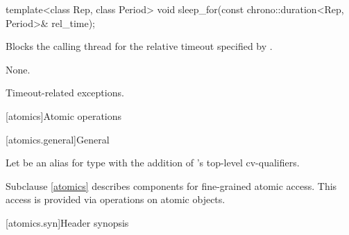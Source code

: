 %
\begin{itemdecl}
template<class Rep, class Period>
  void sleep_for(const chrono::duration<Rep, Period>& rel_time);
\end{itemdecl}

\begin{itemdescr}
\pnum
{}%
\effects
Blocks the calling thread for the relative timeout specified
by .

\pnum
\sync
None.

\pnum
\throws
Timeout-related exceptions.
\end{itemdescr}

[atomics]{Atomic operations}

[atomics.general]{General}

\pnum
Let  be an alias for type 
with the addition of 's top-level cv-qualifiers.

\pnum
Subclause \ref{atomics} describes components for fine-grained atomic access.
This access is provided via operations on atomic objects.

[atomics.syn]{Header  synopsis}

